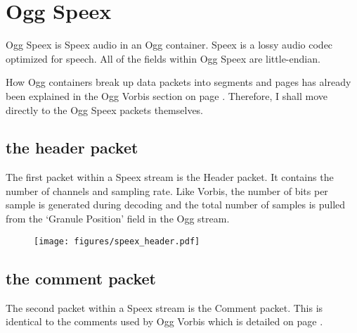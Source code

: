 \chapter{Ogg Speex}
Ogg Speex is Speex audio in an Ogg container.
Speex is a lossy audio codec optimized for speech.
All of the fields within Ogg Speex are little-endian.

How Ogg containers break up data packets into segments and pages
has already been explained in the Ogg Vorbis section on page \pageref{vorbis}.
Therefore, I shall move directly to the Ogg Speex packets themselves.

\section{the header packet}

The first packet within a Speex stream is the Header packet.
It contains the number of channels and sampling rate.
Like Vorbis, the number of bits per sample is generated during
decoding and the total number of samples is pulled from the
`Granule Position' field in the Ogg stream.

\begin{figure}[h]
\texttt{[image: figures/speex\_header.pdf]}
\end{figure}

\section{the comment packet}

The second packet within a Speex stream is the Comment packet.
This is identical to the comments used by Ogg Vorbis which is
detailed on page \pageref{vorbiscomment}.
